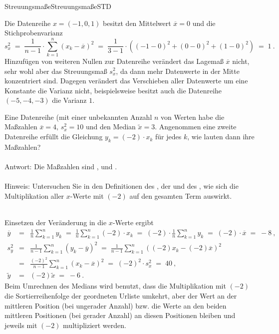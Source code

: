 \begin{MXContent}{Streuungsmaße}{Streuungsmaße}{STD}
\begin{MExample}
Die Datenreihe $x=(-1,0,1)$ besitzt den Mittelwert $\overline{x}=0$ und die Stichprobenvarianz
$$
s^2_x \;=\;\frac{1}{n-1}\cdot \sum\limits_{k=1}^{n}(x_{k}-\overline{x})^{2}\;=\; \frac1{3-1}\cdot \left({(-1-0)^2+(0-0)^2+(1-0)^2}\right)\;=\; 1\: .
$$
Hinzufügen von weiteren Nullen zur Datenreihe verändert das Lagemaß $\overline{x}$ nicht, sehr wohl aber das Streuungsmaß $s^2_x$, da dann mehr Datenwerte in der Mitte konzentriert sind.
Dagegen verändert das Verschieben aller Datenwerte um eine Konstante die Varianz nicht, beispielsweise besitzt auch die Datenreihe $(-5,-4,-3)$ die Varianz $1$.
\end{MExample}

\begin{MExercise}
Eine Datenreihe (mit einer unbekannten Anzahl $n$ von Werten habe die Maßzahlen $\overline{x}=4$, $s^2_x=10$ und den Median $\tilde x=3$.
Angenommen eine zweite Datenreihe erfüllt die Gleichung $y_k = (-2)\cdot x_k$ für jedes $k$, wie lauten dann ihre Maßzahlen?
\ \\ \ \\
Antwort: Die Maßzahlen sind , 
und .
\ \\ \ \\
Hinweis: Untersuchen Sie in den Definitionen des , der  und des
, wie sich die Multiplikation aller $x$-Werte mit $(-2)$ auf den gesamten Term auswirkt.
\ \\ \ \\
\begin{MHint}{\iSolution}
Einsetzen der Veränderung in die $x$-Werte ergibt
\begin{eqnarray*}
\overline{y} &=& \frac1n\sum_{k=1}^n y_k \;=\;\frac1n\sum_{k=1}^n (-2)\cdot x_k \;=\; (-2)\cdot \frac1n\sum_{k=1}^n y_k \;=\; (-2)\cdot \overline{x} \;=\; -8\:,\\
s^2_y &=& \frac1{n-1}\sum_{k=1}^n \left({y_k-\overline{y}}\right)^2 \;=\;\frac1{n-1}\sum_{k=1}^n \left({(-2)x_k-(-2)\overline{x}}\right)^2\ \\
&=& \frac{(-2)^2}{n-1}\sum_{k=1}^n \left({x_k-\overline{x}}\right)^2 \;=\; (-2)^2\cdot s_x^2 \;=\;40\: ,\ \\
\tilde{y} &=& (-2)\tilde{x} \;=\; -6\: .
\end{eqnarray*}
Beim Umrechnen des Medians wird benutzt, dass die Multiplikation mit $(-2)$ die Sortierreihenfolge der geordneten Urliste umkehrt,
aber der Wert an der mittleren Position (bei ungerader Anzahl) bzw. die Werte an den beiden mittleren Positionen (bei gerader Anzahl) an diesen
Positionen bleiben und jeweils mit $(-2)$ multipliziert werden.
\end{MHint}
\end{MExercise}
\end{MXContent}


